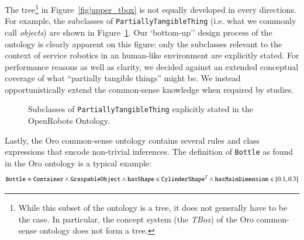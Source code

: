 \documentclass[preprint,3p,times]{elsarticle}
\newcommand{\concept}[1]{{\small \texttt{#1}}}
\newcommand{\ie}{i.e.\xspace}
\begin{document}
The tree\footnote{While this subset of the ontology is a tree, it does not
generally have to be the case. In particular, the concept system (the
\emph{TBox}) of the {\sc Oro} common-sense ontology does not form a tree.} in
Figure~\ref{fig|upper_tbox} is not equally developed in every directions. For
example, the subclasses of \concept{PartiallyTangibleThing} (\ie what we
commonly call \emph{objects}) are shown in
Figure~\ref{fig|tangible_things_tbox}. Our `bottom-up'' design process of the
ontology is clearly apparent on this figure: only the subclasses relevant to the
context of service robotics in an human-like environment are explicitly stated.
For performance reasons as well as clarity, we decided against an extended
conceptual coverage of what ``partially tangible things'' might be. We instead
opportunistically extend the common-sense knowledge when required by studies.


\begin{figure}
    \centering

    \caption{Subclasses of \concept{PartiallyTangibleThing} explicitly stated in the
    OpenRobots Ontology.}
    \label{fig|tangible_things_tbox}
\end{figure}

Lastly, the {\sc Oro} common-sense ontology contains several rules and class
expressions that encode non-trivial inferences. The definition of
\concept{Bottle} as found in the {\sc Oro} ontology is a typical example:
$$
\text{\tt Bottle} \equiv \text{\tt Container} \wedge 
                         \text{\tt GraspableObject} \wedge
                         \text{\tt hasShape} \in \text{\tt CylinderShape}^{\mathcal{I}} \wedge
                         \text{\tt hasMainDimension} \in [0.1, 0.3]
$$
\end{document}
